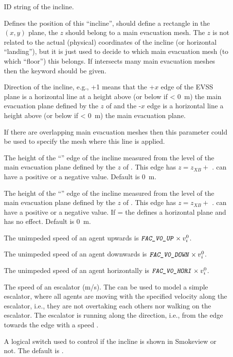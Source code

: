 \documentclass[12pt,a4paper,final,twoside]{stylevk}
\begin{document}
\begin{description}
%
%
\item[] ID string of the incline.
%
\item[] Defines the position of this ``incline'', should
  define a rectangle in the $(x,y)$ plane, the $z$ should belong to a
  main evacuation mesh.  The $z$ is not related to the actual
  (physical) coordinates of the incline (or horizontal ``landing''),
  but it is just used to decide to which main evacuation mesh (to
  which ``floor'') this  belongs.  If 
  intersects many main evacuation meshes then the keyword
   should be given.
%
\item[] Direction of the incline, e.g., +1 means
  that the +$x$ edge of the EVSS plane is a horizontal line at a
  height  above (or below if < 0~m) the main evacuation
  plane defined by the $z$ of  and the -$x$ edge is a
  horizontal line a height  above (or below if < 0~m)
  the main evacuation plane.
%
\item[] If there are overlapping main evacuation
  meshes then this parameter could be used to specify the mesh where
  this  line is applied.
%
\item[] The height of the ``'' edge of the
  incline measured from the level of the main evacuation plane defined
  by the $z$ of .  This edge has $z = z_{\scriptscriptstyle
    XB} +$ .   can have a positive or a
  negative value.  Default is 0~m.
%
\item[] The height of the ``'' edge of the
  incline measured from the level of the main evacuation plane defined
  by the $z$ of .  This edge has $z = z_{\scriptscriptstyle
    XB} +$ .   can have a positive or a
  negative value.  If = the 
  defines a horizontal plane and  has no effect.  Default
  is 0~m.
%
\item[] The unimpeded speed of an agent upwards is
  $\textnormal{\texttt{\textsl{FAC\_V0\_UP}}} \times v_i^0$.
%
\item[] The unimpeded speed of an agent downwards
  is $\textnormal{\texttt{\textsl{FAC\_V0\_DOWN}}} \times v_i^0$.
%
\item[] The unimpeded speed of an agent
  horizontally is $\textnormal{\texttt{\textsl{FAC\_V0\_HORI}}} \times
  v_i^0$.
%
\item[] The speed of an escalator (m/s).  The
   can be used to model a simple escalator, where all
  agents are moving with the specified velocity 
  along the escalator, i.e., they are not overtaking each
  others nor walking on the escalator.  The escalator is running along
  the  direction, i.e., from the 
  edge towards the  edge with a speed
  .
%
\item[] A logical switch used to control if the incline is
  shown in Smokeview or not.  The default is .
%
\end{description}
%
\end{document}
